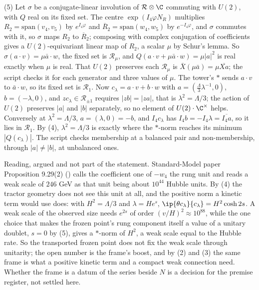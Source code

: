 (5) Let $\sigma$ be a conjugate-linear involution of $\mathcal{R}\otimes\C$ commuting with $U(2)$, with $Q$ real on its fixed set. The centre $\exp(I_{4}\varphi N_{R})$ multiplies $R_{2} = \mathrm{span}(v_{4}, v_{5})$ by $e^{I_{4}\varphi}$ and $\overline{R}_{2} = \mathrm{span}(w_{4}, w_{5})$ by $e^{-I_{4}\varphi}$, and $\sigma$ commutes with it, so $\sigma$ maps $R_{2}$ to $\overline{R}_{2}$; composing with complex conjugation of coefficients gives a $U(2)$-equivariant linear map of $R_{2}$, a scalar $\mu$ by Schur's lemma. So $\sigma(a\cdot v) = \mu\bar{a}\cdot w$, the fixed set is $\mathcal{R}_{\mu}$, and $Q(a\cdot v + \mu\bar{a}\cdot w) = \mu|a|^{2}$ is real exactly when $\mu$ is real. That $U(2)$ preserves each $\mathcal{R}_{\mu}$ is $\bar{X}(\mu\bar{a}) = \mu\overline{Xa}$; the script checks it for each generator and three values of $\mu$. The tower's $*$ sends $a\cdot v$ to $\bar{a}\cdot w$, so its fixed set is $\mathcal{R}_{1}$. Now $c_{\lambda} = a\cdot v + b\cdot w$ with $a = (\tfrac{\Lambda}{3}\lambda^{-1}, 0)$, $b = (-\lambda, 0)$, and $zc_{\lambda} \in \mathcal{R}_{\pm 1}$ requires $|zb| = |za|$, that is $\lambda^{2} = \Lambda/3$; the action of $U(2)$ preserves $|a|$ and $|b|$ separately, so no element of $U(2)\cdot\C^{\times}$ helps. Conversely at $\lambda^{2} = \Lambda/3$, $a = (\lambda, 0) = -b$, and $I_{4}c_{\lambda}$ has $I_{4}b = -I_{4}\lambda = \overline{I_{4}a}$, so it lies in $\mathcal{R}_{1}$. By (4), $\lambda^{2} = \Lambda/3$ is exactly where the $*$-norm reaches its minimum $|Q(c_{\lambda})|$. The script checks membership at a balanced pair and non-membership, through $|a| \neq |b|$, at unbalanced ones.

Reading, argued and not part of the statement. Standard-Model paper Proposition 9.29(2) () calls the coefficient one of $-w_{4}$ the rung unit and reads a weak scale of $246$ GeV as that unit being about $10^{44}$ Hubble units. By (4) the tractor geometry does not see this unit at all, and the positive norm a kinetic term would use does: with $H^{2} = \Lambda/3$ and $\lambda = H e^{s}$, $\ip{\theta c_{\lambda}}{c_{\lambda}} = H^{2}\cosh 2s$. A weak scale of the observed size needs $e^{2s}$ of order $(v/H)^{2} \approx 10^{88}$, while the one choice that makes the frozen point's rung component itself a value of a unitary doublet, $s = 0$ by (5), gives a $*$-norm of $H^{2}$, a weak scale equal to the Hubble rate. So the transported frozen point does not fix the weak scale through unitarity; the open number is the frame's boost, and by (2) and (3) the same frame is what a positive kinetic term and a compact weak connection need. Whether the frame is a datum of the series beside $N$ is a decision for the premise register, not settled here.
